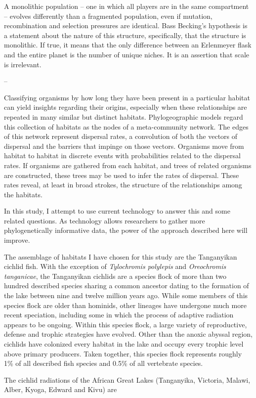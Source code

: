 A monolithic population -- one in which all players are in the same compartment -- evolves differently than a fragmented population, even if mutation, recombination and selection pressures are identical. Bass Becking's hypothesis is a statement about the nature of this structure, specifically, that the structure is monolithic. If true, it means that the only difference between an Erlenmeyer flask and the entire planet is the number of unique niches. It is an assertion that scale is irrelevant.



--

Classifying organisms by how long they have been present in a particular habitat can yield insights regarding their origins, especially when these relationships are repeated in many similar but distinct habitats. Phylogeographic models regard this collection of habitats as the nodes of a meta-community network. The edges of this network represent dispersal rates, a convolution of both the vectors of dispersal and the barriers that impinge on those vectors. Organisms move from habitat to habitat in discrete events with probabilities related to the dispersal rates. If organisms are gathered from each habitat, and trees of related organisms are constructed, these trees may be used to infer the rates of dispersal. These rates reveal, at least in broad strokes, the structure of the relationships among the habitats.



In this study, I attempt to use current technology to answer this and some related questions. As technology allows researchers to gather more phylogenetically informative data, the power of the approach described here will improve. 

The assemblage of habitats I have chosen for this study are the Tanganyikan cichlid fish. With the exception of {\em Tylochromis polylepis} and {\em Oreochromis tanganicae}, the Tanganyikan cichlids are a species flock of more than two hundred described species sharing a common ancestor dating to the formation of the lake between nine and twelve million years ago. While some members of this species flock are older than hominids, other lineages have undergone much more recent speciation, including some in which the process of adaptive radiation appears to be ongoing. Within this species flock, a large variety of reproductive, defense and trophic strategies have evolved. Other than the anoxic abyssal region, cichlids have colonized every habitat in the lake and occupy every trophic level above primary producers. Taken together, this species flock represents roughly 1\% of all described fish species and 0.5\% of all vertebrate species.

The cichlid radiations of the African Great Lakes (Tanganyika, Victoria, Malawi, Alber, Kyoga, Edward and Kivu) are 